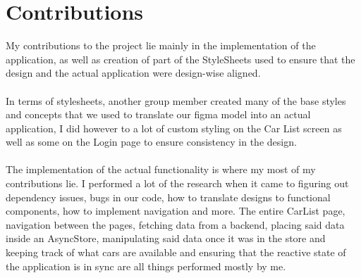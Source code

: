 \section*{Contributions}
My contributions to the project lie mainly in the implementation of the application, as well as creation of part of the StyleSheets used to ensure that the design and the actual application were design-wise aligned.
\\\\
In terms of stylesheets, another group member created many of the base styles and concepts that we used to translate our figma model into an actual application, I did however to a lot of custom styling on the Car List screen as well as some on the Login page to ensure consistency in the design.
\\\\
The implementation of the actual functionality is where my most of my contributions lie. I performed a lot of the research when it came to figuring out dependency issues, bugs in our code, how to translate designs to functional components, how to implement navigation and more. The entire CarList page, navigation between the pages, fetching data from a backend, placing said data inside an AsyncStore, manipulating said data once it was in the store and keeping track of what cars are available and ensuring that the reactive state of the application is in sync are all things performed mostly by me.
